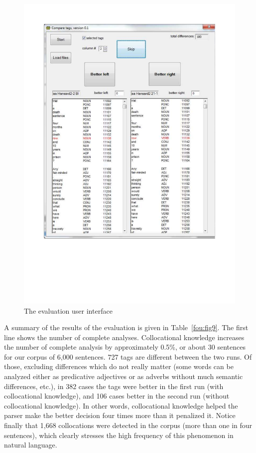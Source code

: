 \documentclass[output=paper]{langsci/langscibook}
\begin{document}
\begin{figure}[p]
  \includegraphics[width=\textwidth, clip, trim=20mm 60mm 20mm 20mm]{figures/fips-screenshot.pdf}
\caption{\label{fou:figScreen}The evaluation user interface}
\end{figure}

A summary of the results of the evaluation is given in Table~\ref{fou:fig9}. The first line shows the number of complete analyses. Collocational knowledge increases the number of complete analysis by approximately 0.5\%, or about 30 sentences for our corpus of 6,000 sentences. 727 tags are different between the two runs. Of those, excluding differences which do not really matter (some words can be analyzed either as predicative adjectives or as adverbs without much semantic differences, etc.), in 382 cases the tags were better in the first run (with collocational knowledge), and 106 cases better in the second run (without collocational knowledge). In other words, collocational knowledge helped the parser make the better decision four times more than it penalized it. Notice finally that 1,668 collocations were detected in the corpus (more than one in four sentences), which clearly stresses the high frequency of this phenomenon in natural language.
\end{document}
